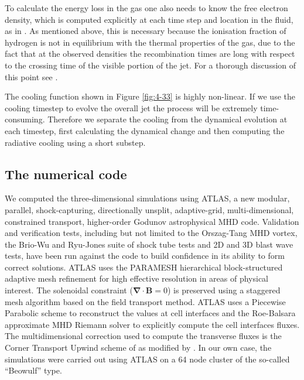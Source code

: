 \documentclass{aa}
\begin{document}
To calculate the energy loss in the gas one also needs to know 
the free electron density, which is 
computed explicitly at each 
time step and location in the fluid, as in \citet{1995MNRAS.272..785F}.
As mentioned above, this is necessary because the
ionisation fraction of hydrogen is not in equilibrium 
with the thermal properties of the gas, due to the fact 
that at the observed densities the recombination
times are long with respect to the crossing time of the visible 
portion of the jet. For a thorough discussion of this point 
see \citet{1997ApJS..109..517R, 1999A&A...342..717B}.

The cooling function shown in Figure \ref{fig:4-33} is highly non-linear.
 If we use the cooling timestep to evolve the overall jet the process will be
 extremely time-consuming.
 Therefore we separate the cooling from the dynamical evolution at each timestep,
 first calculating the dynamical change and then computing the radiative cooling using a short substep.



\subsection{The numerical code}

We computed the three-dimensional simulations using ATLAS, a new modular, parallel, shock-capturing, directionally unsplit, adaptive-grid, multi-dimensional, constrained transport, higher-order Godunov astrophysical
MHD code. Validation and verification tests, including but not limited to the
Orszag-Tang MHD vortex, the Brio-Wu and Ryu-Jones suite of shock tube
tests and 2D and 3D blast wave tests, have been run against the code to build confidence in its ability to form
correct solutions. ATLAS uses the PARAMESH \citep{par:00} hierarchical
block-structured adaptive mesh refinement for high effective resolution in areas
of physical interest. 
The solenoidal constraint (${\mathbf\nabla\cdot \mathbf{B}} =0$) is
preserved using a staggered mesh algorithm based on the \citet{307327} field transport method. 
ATLAS uses a Piecewise Parabolic scheme \citep{1984jcp_colella_woodward} to reconstruct the values at cell interfaces and the Roe-Balsara approximate MHD Riemann solver \citep{Roe81:_approx,Roe:1996:NEM} to explicitly compute the cell interfaces fluxes.
The multidimensional correction used to compute the transverse fluxes is the Corner Transport Upwind scheme of \citet{Colella90:_multida} as modified by \citet{Saltzman94:_an_uns}.
In our own case, the simulations were carried out using ATLAS on a 64 node cluster of the so-called ``Beowulf'' type.
\end{document}
